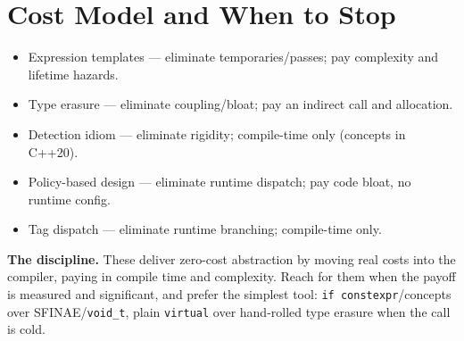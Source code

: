 \section{Cost Model and When to Stop}
\begin{itemize}
\item Expression templates --- eliminate temporaries/passes; pay complexity and lifetime hazards.
\item Type erasure --- eliminate coupling/bloat; pay an indirect call and allocation.
\item Detection idiom --- eliminate rigidity; compile-time only (concepts in C++20).
\item Policy-based design --- eliminate runtime dispatch; pay code bloat, no runtime config.
\item Tag dispatch --- eliminate runtime branching; compile-time only.
\end{itemize}

\textbf{The discipline.} These deliver zero-cost abstraction by moving real costs into the compiler, paying in compile time and complexity. Reach for them when the payoff is measured and significant, and prefer the simplest tool: \texttt{if constexpr}/concepts over SFINAE/\texttt{void\_t}, plain \texttt{virtual} over hand-rolled type erasure when the call is cold.
